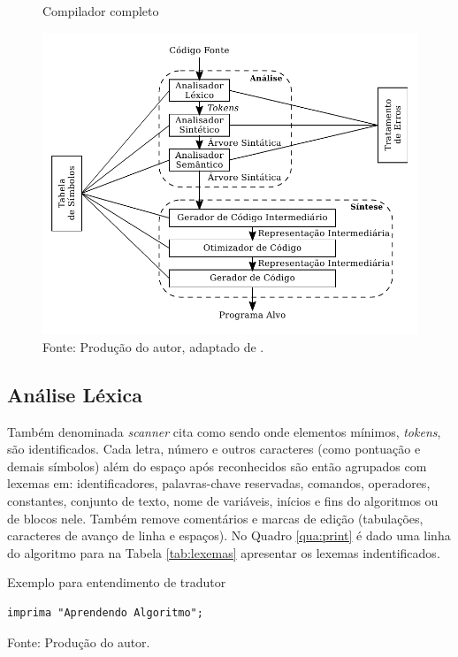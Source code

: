 \begin{figure}[h]
  \caption{Compilador completo}\label{fig:fullcompiler}
  \centering
\includegraphics[width=.5\textwidth,keepaspectratio]{figures/compilador-completo.pdf}
  \caption*{\footnotesize Fonte: Produção do autor, adaptado de .}
\end{figure}

%
\subsection{Análise Léxica}

Também denominada \textit{scanner} cita  como sendo onde elementos mínimos, \textit{tokens}, são identificados. Cada letra, número e outros caracteres (como pontuação e demais símbolos)  além do espaço após reconhecidos são então agrupados com lexemas em: identificadores, palavras-chave reservadas, comandos, operadores, constantes, conjunto de texto, nome de variáveis, inícios e fins do algoritmos ou de blocos nele. Também remove comentários e marcas de edição (tabulações, caracteres de avanço de linha e espaços). No Quadro \ref{qua:print} é dado uma linha do algoritmo para na Tabela \ref{tab:lexemas} apresentar os lexemas indentificados.

\begin{quadro}[h]
\centering
  \caption{Exemplo para entendimento de tradutor}\label{qua:print}
\begin{lstlisting}[language=ual,frame=single]
  imprima "Aprendendo Algoritmo";
\end{lstlisting}
  \caption*{\ifdraft{\color{green}}{}\footnotesize Fonte: Produção do autor.}
\end{quadro}

